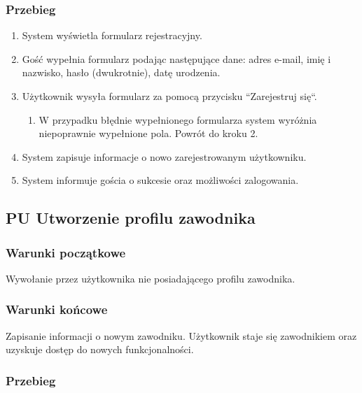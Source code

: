 \subsubsection{Przebieg}
\begin{enumerate}
  \item System wyświetla formularz rejestracyjny.
  \item Gość wypełnia formularz podając następujące dane: adres e-mail, imię i nazwisko, hasło (dwukrotnie), datę urodzenia.
  \item Użytkownik wysyła formularz za pomocą przycisku ``Zarejestruj się``.
  \begin{enumerate}[label=(\alph*)]
     \item W przypadku błędnie wypełnionego formularza system wyróżnia niepoprawnie wypełnione pola. Powrót do kroku 2.
   \end{enumerate}
  \item System zapisuje informacje o nowo zarejestrowanym użytkowniku.
  \item System informuje gościa o sukcesie oraz możliwości zalogowania.
\end{enumerate}


\subsection*{PU Utworzenie profilu zawodnika}

\subsubsection{Warunki początkowe}
Wywołanie przez użytkownika nie posiadającego profilu zawodnika.

\subsubsection{Warunki końcowe}
Zapisanie informacji o nowym zawodniku. Użytkownik staje się zawodnikiem oraz uzyskuje dostęp do nowych funkcjonalności.

\subsubsection{Przebieg}

